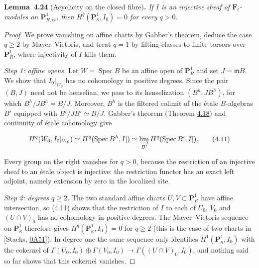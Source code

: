 \documentclass[11pt]{article}
\newenvironment{bpstatement}[2]{\par\addvspace{0.6\baselineskip}\noindent\textbf{#1}#2\textbf{.}\enspace\ignorespaces}
  {\par\addvspace{0.4\baselineskip}}
\newenvironment{bpstatementit}[2]{\begin{bpstatement}{#1}{#2}\itshape\ignorespaces}{\end{bpstatement}}
\begin{document}
\label{bp352}%
\begin{bpstatementit}{Lemma~4.24}{ (Acyclicity on the closed fibre)}
If \(I\) is an injective sheaf of \(\mathbf F_\ell\)-modules on \(\mathbf P^1_{R,\acute{e}t}\), then \(H^q(\mathbf P^1_\kappa,I_0)=0\) for every \(q>0\).
\end{bpstatementit}

\begin{proof}[{Proof}]\label{bp353}%
We prove vanishing on affine charts by Gabber's theorem, deduce the case \(q\geq2\) by Mayer–Vietoris, and treat \(q=1\) by lifting classes to finite torsors over \(\mathbf P^1_R\), where injectivity of \(I\) kills them.

\emph{Step 1: affine opens.} Let \(W=\operatorname{Spec}B\) be an affine open of \(\mathbf P^1_R\) and set \(J=\mathfrak mB\). We show that \(I_0|_{W_0}\) has no cohomology in positive degrees. Since the pair \((B,J)\) need not be henselian, we pass to its henselization \((B^h,JB^h)\), for which \(B^h/JB^h=B/J\). Moreover, \(B^h\) is the filtered colimit of the étale \(B\)-algebras \(B'\) equipped with \(B'/JB'\simeq B/J\). Gabber's theorem (Theorem \hyperref[bp335]{4.18}) and continuity of étale cohomology give

\[
H^q(W_0,I_0|_{W_0})
\simeq H^q(\operatorname{Spec}B^h,I|)
\simeq\varinjlim_{B'}H^q(\operatorname{Spec}B',I|).
\tag{4.11}
\]

Every group on the right vanishes for \(q>0\), because the restriction of an injective sheaf to an étale object is injective: the restriction functor has an exact left adjoint, namely extension by zero in the localized site.

\emph{Step 2: degrees \(q\geq2\).} The two standard affine charts \(U,V\subset \mathbf P^1_R\) have affine intersection, so (4.11) shows that the restriction of \(I\) to each of \(U_0\), \(V_0\) and \((U\cap V)_0\) has no cohomology in positive degrees. The Mayer–Vietoris sequence on \(\mathbf P^1_\kappa\) therefore gives \(H^q(\mathbf P^1_\kappa,I_0)=0\) for \(q\geq2\) (this is the case of two charts in [Stacks, \href{https://stacks.math.columbia.edu/tag/0A51}{0A51}]). In degree one the same sequence only identifies \(H^1(\mathbf P^1_\kappa,I_0)\) with the cokernel of \(\Gamma(U_0,I_0)\oplus\Gamma(V_0,I_0)\to\Gamma((U\cap V)_0,I_0)\), and nothing said so far shows that this cokernel vanishes.


\end{proof}
\end{document}
